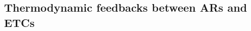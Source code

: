 \documentclass[letterpaper,12pt]{article}
\begin{document}
\subsection{Thermodynamic feedbacks between ARs and ETCs}\label{sec:ARsandETCs}

\end{document}
